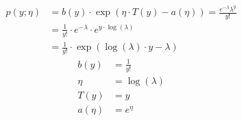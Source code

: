 \begin{answer}
\begin{align*}
p(y; \eta)&=b(y)\cdot \exp(\eta\cdot T(y)-a(\eta))=\frac{e^{-\lambda}\lambda^y}{y!}\\
&=\frac{1}{y!}\cdot e^{-\lambda}\cdot  e^{y\cdot\log(\lambda)}\\
&=\frac{1}{y!}\cdot \exp\left(\log(\lambda)\cdot y-\lambda\right)
\end{align*}
\begin{align*}
b(y)&=\frac{1}{y!}\\
\eta&=\log(\lambda)\\
T(y)&=y\\
a(\eta)&=e^{\eta}
\end{align*}
\end{answer}
